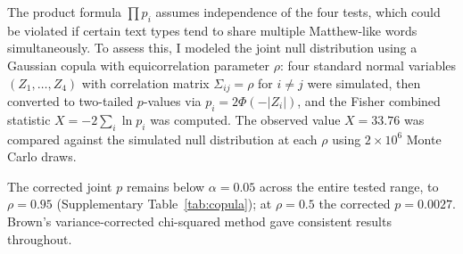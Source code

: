 \documentclass[11pt,a4paper]{article}
\begin{document}
The product formula $\prod p_i$ assumes independence of the four tests,
which could be violated if certain text types tend to share multiple
Matthew-like words simultaneously. To assess this, I modeled the joint
null distribution using a Gaussian copula with equicorrelation
parameter $\rho$: four standard normal variables $(Z_1,\ldots,Z_4)$
with correlation matrix $\Sigma_{ij} = \rho$ for $i\neq j$ were
simulated, then converted to two-tailed $p$-values via
$p_i = 2\Phi(-|Z_i|)$, and the Fisher combined statistic
$X = -2\sum_i \ln p_i$ was computed. The observed value $X = 33.76$
was compared against the simulated null distribution at each
$\rho$ using $2\times10^6$ Monte Carlo draws.

The corrected joint $p$ remains below $\alpha = 0.05$ across the entire
tested range, to $\rho = 0.95$ (Supplementary Table~\ref{tab:copula}); at $\rho=0.5$ the
corrected $p = 0.0027$. Brown's variance-corrected chi-squared
method\cite{brown1975} gave consistent results throughout.
\end{document}
